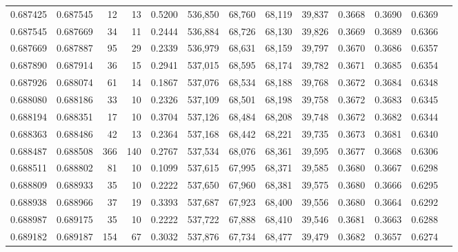 \begin{tabular}{rrrrrrrrrrrrr}
0.687425 & 0.687545 &    12 &  13 &                                     0.5200 & 536,850 &  68,760 &  68,119 &  39,837 & 0.3668 & 0.3690 & 0.6369 \\
0.687545 & 0.687669 &    34 &  11 &                                     0.2444 & 536,884 &  68,726 &  68,130 &  39,826 & 0.3669 & 0.3689 & 0.6366 \\
0.687669 & 0.687887 &    95 &  29 &                                     0.2339 & 536,979 &  68,631 &  68,159 &  39,797 & 0.3670 & 0.3686 & 0.6357 \\
0.687890 & 0.687914 &    36 &  15 &                                     0.2941 & 537,015 &  68,595 &  68,174 &  39,782 & 0.3671 & 0.3685 & 0.6354 \\
0.687926 & 0.688074 &    61 &  14 &                                     0.1867 & 537,076 &  68,534 &  68,188 &  39,768 & 0.3672 & 0.3684 & 0.6348 \\
0.688080 & 0.688186 &    33 &  10 &                                     0.2326 & 537,109 &  68,501 &  68,198 &  39,758 & 0.3672 & 0.3683 & 0.6345 \\
0.688194 & 0.688351 &    17 &  10 &                                     0.3704 & 537,126 &  68,484 &  68,208 &  39,748 & 0.3672 & 0.3682 & 0.6344 \\
0.688363 & 0.688486 &    42 &  13 &                                     0.2364 & 537,168 &  68,442 &  68,221 &  39,735 & 0.3673 & 0.3681 & 0.6340 \\
0.688487 & 0.688508 &   366 & 140 &                                     0.2767 & 537,534 &  68,076 &  68,361 &  39,595 & 0.3677 & 0.3668 & 0.6306 \\
0.688511 & 0.688802 &    81 &  10 &                                     0.1099 & 537,615 &  67,995 &  68,371 &  39,585 & 0.3680 & 0.3667 & 0.6298 \\
0.688809 & 0.688933 &    35 &  10 &                                     0.2222 & 537,650 &  67,960 &  68,381 &  39,575 & 0.3680 & 0.3666 & 0.6295 \\
0.688938 & 0.688966 &    37 &  19 &                                     0.3393 & 537,687 &  67,923 &  68,400 &  39,556 & 0.3680 & 0.3664 & 0.6292 \\
0.688987 & 0.689175 &    35 &  10 &                                     0.2222 & 537,722 &  67,888 &  68,410 &  39,546 & 0.3681 & 0.3663 & 0.6288 \\
0.689182 & 0.689187 &   154 &  67 &                                     0.3032 & 537,876 &  67,734 &  68,477 &  39,479 & 0.3682 & 0.3657 & 0.6274 \\

\end{tabular}
